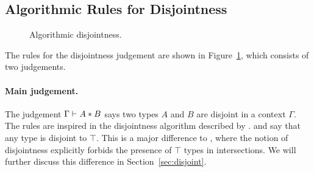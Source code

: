 \subsection{Algorithmic Rules for Disjointness}

\begin{figure}[!t]
  \begin{spacing}{0.5}
  \end{spacing}
  \caption{Algorithmic disjointness.}
  \label{fig:disjointness}
\end{figure}

The rules for the disjointness judgement are shown in
Figure~\ref{fig:disjointness}, which consists of two judgements.
 
\paragraph{Main judgement.} The judgement $\Gamma \vdash A * B$ says
two types $A$ and $B$ are disjoint in a context $\Gamma$.
The rules are inspired in the disjointness algorithm described by \oldname.
 and  say that any type is disjoint to 
$\top$.
This is a major difference to \oldname, where the notion of disjointness explicitly forbids
the presence of $\top$ types in intersections.
We will further discuss this difference in Section~\ref{sec:disjoint}.
 
